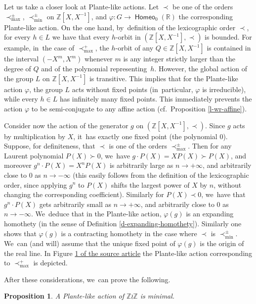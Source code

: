 \documentclass[10pt]{amsart}
\newtheorem{prop}[thm]{Proposition}
\theoremstyle{definition}
\DeclareMathOperator{\homeo}{\mathsf{Homeo}}
\newcommand{\R}{\mathbb{R}}
\newcommand{\Z}{\mathbb Z}
\begin{document}
Let us take a closer look at Plante-like actions. Let $\prec$ be one of the orders $\prec_{\max}^\pm$, $\prec_{\min}^\pm$ on $\Z[X, X^{-1}]$, and $\varphi\colon G\to \homeo_0(\R)$ the corresponding Plante-like action. On the one hand, by~definition of the lexicographic order $\prec$, for every $h\in L$ we have that every $h$-orbit in $(\Z[X,X^{-1}], \prec)$ is bounded. For example, in~the case of $\prec_{\max}^+$, the $h$-orbit of any $Q\in \Z[X, X^{-1}]$ is contained in the interval $(-X^m, X^m)$ whenever $m$ is any integer strictly larger than the degree of $Q$ and of the polynomial representing~$h$. However, the global action of the group $L$ on $\Z[X, X^{-1}]$ is transitive. This implies that for the Plante-like action $\varphi$, the group $L$ acts without fixed points (in~particular, $\varphi$ is irreducible), while every $h\in L$ has infinitely many fixed points. This immediately prevents the action $\varphi$ to be semi-conjugate to any affine action (cf.\ Proposition \ref{l-wr-affine}).

Consider now the action of the generator $g$ on $(\Z[X, X^{-1}], \prec)$. Since $g$ acts by multiplication by $X$, it~has exactly one fixed point (the polynomial $0$). Suppose, for definiteness, that $\prec$ is one of the orders $\prec_{\max}^\pm$. Then for any Laurent polynomial $P(X)\succ 0$, we~have $g\cdot P(X)=XP(X)\succ P(X)$, and moreover $g^n\cdot P(X)=X^nP(X)$ is arbitrarily large as $n\to +\infty$, and arbitrarily close to $0$ as $n\to -\infty$ (this easily follows from the definition of the lexicographic order, since applying $g^n$ to $P(X)$ shifts the largest power of $X$ by $n$, without changing the corresponding coefficient). Similarly for $P(X)\prec 0$, we~have that $g^n\cdot P(X)$ gets arbitrarily small as $n\to +\infty$, and arbitrarily close to $0$ as $n\to -\infty$. We~deduce that in the Plante-like action, $\varphi(g)$ is an expanding homothety (in the sense of Definition \ref{d-expanding-homothety}). Similarly one shows that $\varphi(g)$ is a contracting homothety in the case where $\prec$ is $\prec_{\min}^\pm$. We~can (and will) assume that the unique fixed point of $\varphi(g)$ is the origin of the real line. In Figure \href{https://doi.org/10.5802/jep.284}{1 of the source article} the Plante-like action corresponding to $\prec_{\max}^+$ is depicted.

\setcounter{thm}{7}
After these considerations, we~can prove the following.

\begin{prop} A Plante-like action of $\Z\wr\Z$ is minimal.
\label{prop Plante-like minimal}
\end{prop}
\end{document}
